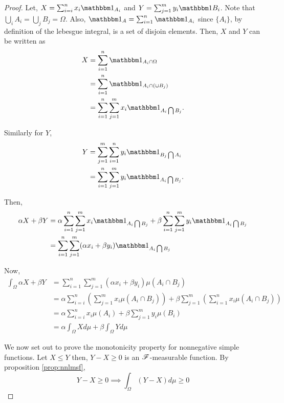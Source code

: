 \documentclass[../TGMAFFIRO.tex]{subfiles}
\begin{document}
\begin{proof}
	Let, $X = \sum_{i=i}^{n}x_i\ind_{A_i}$ and $Y = \sum_{j=1}^{m}y_i\ind{B_i}$. Note that $\bigcup_i A_i = \bigcup_j B_j = \Omega$. Also, $\ind_A = \sum_{i=1}^{n}\ind_{A_i}$ since $\{A_i\}$, by definition of the lebesgue integral, is a set of disjoin elements. Then, $X$ and $Y$ can be written as
	\begin{align*}
		X	&= \sum_{i=1}^{n}\ind_{A_i\cap\Omega} \\
			&= \sum_{i=1}^{n}\ind_{A_i\cap\left(\cup B_j\right)}\\
			&= \sum_{i=1}^{n} \sum_{j=1}^{m} x_i \ind_{A_i \bigcap B_j}.
	\end{align*}
	
	Similarly for $Y$,
	\begin{align*}
		Y	&= \sum_{j=1}^{m} \sum_{i=1}^{n} y_i \ind_{B_j \bigcap A_i} \\
			&= \sum_{i=1}^{n} \sum_{j=1}^{m} y_i \ind_{A_i \bigcap B_j}.
	\end{align*}
	
	Then,
	\begin{align*}
		\alpha X + \beta Y  &= \alpha \sum_{i=1}^{n} \sum_{j=1}^{m} x_i \ind_{A_i \bigcap B_j} + \beta \sum_{i=1}^{n} \sum_{j=1}^{m} y_i \ind_{A_i \bigcap B_j} \\
				&= \sum_{i=1}^{n} \sum_{j=1}^{m} (\alpha x_i + \beta y_i) \ind_{A_i \bigcap B_j}
	\end{align*}
	
	Now, 
	\begin{align*}
		\int_\Omega\alpha X+\beta Y &= \sum_{i=1}^{n} \sum_{j=1}^{m} (\alpha x_i + \beta y_i) \mu(A_i \cap B_j) \\
		&= \alpha \sum_{i=i}^{n}\left(\sum_{j=1}^{m} x_i \mu(A_i\cap B_j) \right) + \beta \sum_{j=1}^{m}\left(\sum_{i=1}^{n} x_i \mu(A_i\cap B_j) \right)\\
		&= \alpha \sum_{i=i}^{n}x_i \mu(A_i) + \beta\sum_{j=1}^{m} y_i \mu(B_i) \\
		&= \alpha \int_\Omega X d\mu + \beta\int_\Omega Y d\mu
	\end{align*}
	
	We now set out to prove the monotonicity property for nonnegative simple functions. 
	Let $X \leq Y$ then, $Y - X \geq 0$ is an $\mathscr{F}$-measurable function. By proposition \ref{prop:nnlmsf},
	\begin{equation}
		Y - X \geq 0 \implies \int_\Omega (Y - X) d\mu \geq 0
	\end{equation}	
\end{proof}
\end{document}
